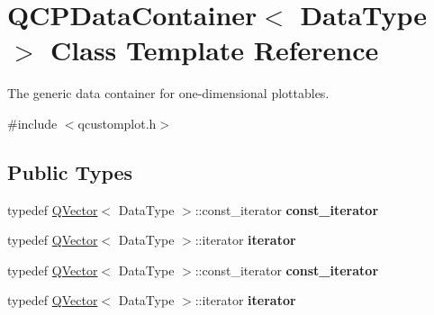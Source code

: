 \hypertarget{class_q_c_p_data_container}{}\section{Q\+C\+P\+Data\+Container$<$ Data\+Type $>$ Class Template Reference}
\label{class_q_c_p_data_container}


The generic data container for one-\/dimensional plottables.  




{\ttfamily \#include $<$qcustomplot.\+h$>$}

\subsection*{Public Types}
\begin{DoxyCompactItemize}
\item 
\mbox{\label{class_q_c_p_data_container_ae40a91f5cb0bcac61d727427449b7d15}} 
typedef \hyperlink{class_q_vector}{Q\+Vector}$<$ Data\+Type $>$\+::const\+\_\+iterator {\bfseries const\+\_\+iterator}
\item 
\mbox{\label{class_q_c_p_data_container_a1bb453c3ae37d1ee5268878acb3a9d29}} 
typedef \hyperlink{class_q_vector}{Q\+Vector}$<$ Data\+Type $>$\+::iterator {\bfseries iterator}
\item 
\mbox{\label{class_q_c_p_data_container_ae40a91f5cb0bcac61d727427449b7d15}} 
typedef \hyperlink{class_q_vector}{Q\+Vector}$<$ Data\+Type $>$\+::const\+\_\+iterator {\bfseries const\+\_\+iterator}
\item 
\mbox{\label{class_q_c_p_data_container_a1bb453c3ae37d1ee5268878acb3a9d29}} 
typedef \hyperlink{class_q_vector}{Q\+Vector}$<$ Data\+Type $>$\+::iterator {\bfseries iterator}
\end{DoxyCompactItemize}
